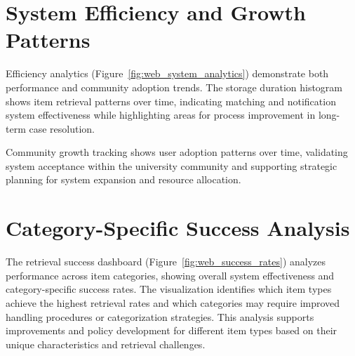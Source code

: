 \section{System Efficiency and Growth Patterns} \label{section:efficiency_growth}

Efficiency analytics (Figure~\ref{fig:web_system_analytics}) demonstrate both performance and community adoption trends. The storage duration histogram shows item retrieval patterns over time, indicating matching and notification system effectiveness while highlighting areas for process improvement in long-term case resolution.

Community growth tracking shows user adoption patterns over time, validating system acceptance within the university community and supporting strategic planning for system expansion and resource allocation.

\section{Category-Specific Success Analysis} \label{section:success_analysis}

The retrieval success dashboard (Figure~\ref{fig:web_success_rates}) analyzes performance across item categories, showing overall system effectiveness and category-specific success rates. The visualization identifies which item types achieve the highest retrieval rates and which categories may require improved handling procedures or categorization strategies. This analysis supports improvements and policy development for different item types based on their unique characteristics and retrieval challenges.